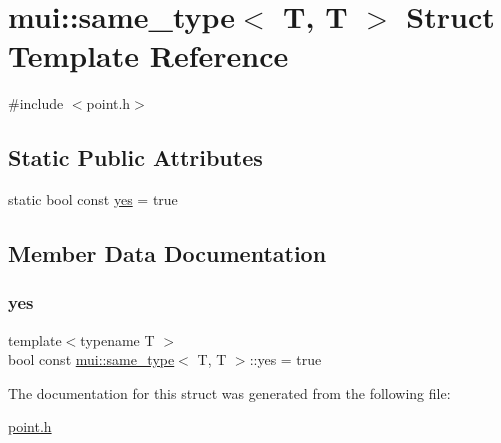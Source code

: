 \hypertarget{structmui_1_1same__type_3_01_t_00_01_t_01_4}{}\section{mui\+:\+:same\+\_\+type$<$ T, T $>$ Struct Template Reference}
\label{structmui_1_1same__type_3_01_t_00_01_t_01_4}


{\ttfamily \#include $<$point.\+h$>$}

\subsection*{Static Public Attributes}
\begin{DoxyCompactItemize}
\item 
static bool const \hyperlink{structmui_1_1same__type_3_01_t_00_01_t_01_4_ae1066af88bfc22940869640c18b10571}{yes} = true
\end{DoxyCompactItemize}


\subsection{Member Data Documentation}
\mbox{\label{structmui_1_1same__type_3_01_t_00_01_t_01_4_ae1066af88bfc22940869640c18b10571}} 
\subsubsection{\texorpdfstring{yes}{yes}}
{\footnotesize\ttfamily template$<$typename T $>$ \\
bool const \hyperlink{structmui_1_1same__type}{mui\+::same\+\_\+type}$<$ T, T $>$\+::yes = true\hspace{0.3cm}{\ttfamily [static]}}



The documentation for this struct was generated from the following file\+:\begin{DoxyCompactItemize}
\item 
\hyperlink{point_8h}{point.\+h}\end{DoxyCompactItemize}
